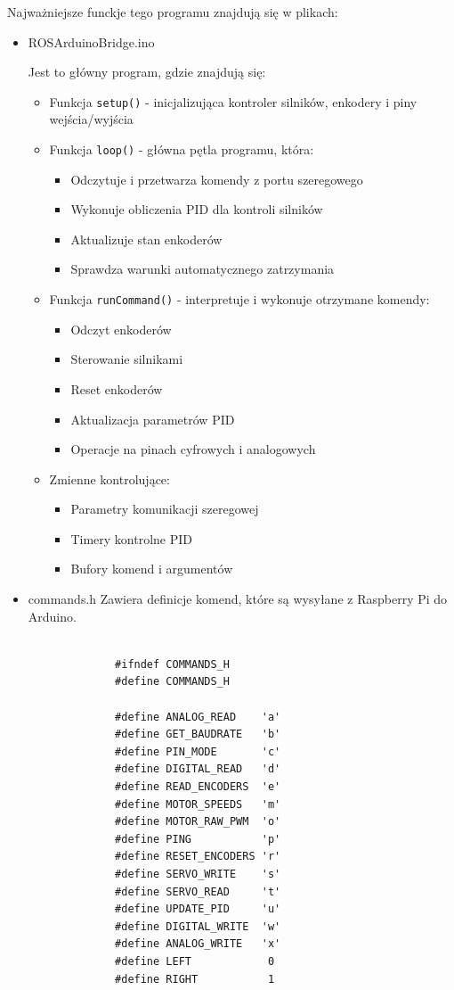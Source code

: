 \documentclass[a4paper,twoside,12pt]{book}
\begin{document}
Najważniejsze funckje tego programu znajdują się w plikach:
\begin{itemize}
	\item ROSArduinoBridge.ino

	Jest to główny program, gdzie znajdują się:
	\begin{itemize}
		\item Funkcja \texttt{setup()} - inicjalizująca kontroler silników, enkodery i piny wejścia/wyjścia
		\item Funkcja \texttt{loop()} - główna pętla programu, która:
		\begin{itemize}
			\item Odczytuje i przetwarza komendy z portu szeregowego
			\item Wykonuje obliczenia PID dla kontroli silników
			\item Aktualizuje stan enkoderów
			\item Sprawdza warunki automatycznego zatrzymania
		\end{itemize}
		\item Funkcja \texttt{runCommand()} - interpretuje i wykonuje otrzymane komendy:
		\begin{itemize}
			\item Odczyt enkoderów
			\item Sterowanie silnikami
			\item Reset enkoderów
			\item Aktualizacja parametrów PID
			\item Operacje na pinach cyfrowych i analogowych
		\end{itemize}
		\item Zmienne kontrolujące:
		\begin{itemize}
			\item Parametry komunikacji szeregowej
			\item Timery kontrolne PID
			\item Bufory komend i argumentów
		\end{itemize}
	\end{itemize}
	\newpage
	\item commands.h
Zawiera definicje komend, które są wysyłane z Raspberry Pi do Arduino.

\begin{figure}[!hb]
	\centering
	\begin{lstlisting}

		#ifndef COMMANDS_H
		#define COMMANDS_H
		
		#define ANALOG_READ    'a'
		#define GET_BAUDRATE   'b'
		#define PIN_MODE       'c'
		#define DIGITAL_READ   'd'
		#define READ_ENCODERS  'e'
		#define MOTOR_SPEEDS   'm'
		#define MOTOR_RAW_PWM  'o'
		#define PING           'p'
		#define RESET_ENCODERS 'r'
		#define SERVO_WRITE    's'
		#define SERVO_READ     't'
		#define UPDATE_PID     'u'
		#define DIGITAL_WRITE  'w'
		#define ANALOG_WRITE   'x'
		#define LEFT            0
		#define RIGHT           1
		

\end{lstlisting}
\end{figure}
\end{itemize}
\end{document}
